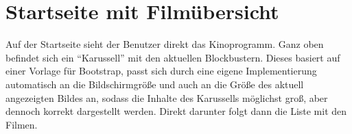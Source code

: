 \section{Startseite mit Filmübersicht}

Auf der Startseite sieht der Benutzer direkt das Kinoprogramm.
Ganz oben befindet sich ein \enquote{Karussell} mit den aktuellen Blockbustern.
Dieses basiert auf einer Vorlage für Bootstrap, passt sich durch eine eigene Implementierung automatisch an die Bildschirmgröße und auch an die Größe des aktuell angezeigten Bildes an, sodass die Inhalte des Karussells möglichst groß, aber dennoch korrekt dargestellt werden.
Direkt darunter folgt dann die Liste mit den Filmen.

\begin{figure}[ht]
	\centering
	\hfill

\end{figure}
